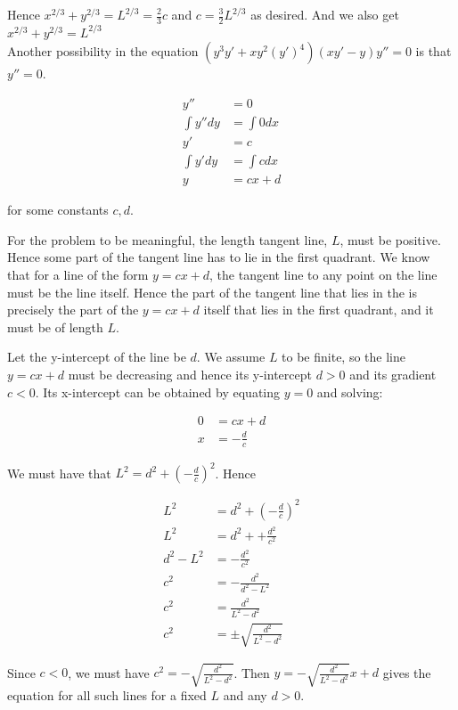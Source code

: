 \documentclass[9pt]{article}
\begin{document}
Hence $x^{2/3} + y^{2/3} = L^{2/3} = \frac{2}{3}c$ and $c = \frac{3}{2} L^{2/3}$ as desired. And we also get $x^{2/3} + y^{2/3} = L^{2/3}$\\

Another possibility in the equation $(y^3y' + xy^2(y')^4)(xy' - y)y'' = 0$ is that $y'' = 0$.

\begin{align*}
  y'' &= 0\\
  \int y'' dy &= \int 0 dx\\
  y' &= c\\
  \int y' dy &= \int c dx\\
  y &= cx + d
\end{align*}

for some constants $c, d$.

For the problem to be meaningful, the length tangent line, $L$, must be positive. Hence some part of the tangent line has to lie in the first quadrant. We know that for a line of the form $y = cx + d$, the tangent line to any point on the line must be the line itself. Hence the part of the tangent line that lies in the is precisely the part of the $y = cx + d$ itself that lies in the first quadrant, and it must be of length $L$.

Let the y-intercept of the line be $d$. We assume $L$ to be finite, so the line $y = cx + d$ must be decreasing and hence its y-intercept $d > 0$ and its gradient $c < 0$. Its x-intercept can be obtained by equating $y = 0$ and solving:

\begin{align*}
  0 &= cx + d\\
  x &= -\frac{d}{c}
\end{align*}

We must have that $L^2 = d^2 + (-\frac{d}{c})^2$. Hence

\begin{align*}
  L^2 &= d^2 + (-\frac{d}{c})^2\\
  L^2 &= d^2 + + \frac{d^2}{c^2}\\
  d^2 - L^2 &= -\frac{d^2}{c^2}\\
  c^2 &= -\frac{d^2}{d^2 - L^2}\\
  c^2 &= \frac{d^2}{L^2 - d^2}\\
  c^2 &= \pm \sqrt{\frac{d^2}{L^2 - d^2}}
\end{align*}

Since $c < 0$, we must have $c^2 = -\sqrt{\frac{d^2}{L^2 - d^2}}$. Then $y = -\sqrt{\frac{d^2}{L^2 - d^2}}x + d$ gives the equation for all such lines for a fixed $L$ and any $d > 0$.\\
\end{document}
